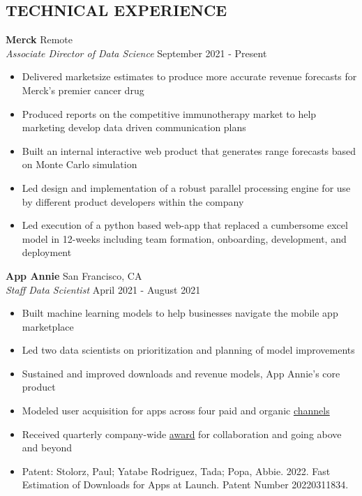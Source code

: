 \documentclass[line,margin,10pt]{res}
\begin{document}
\begin{resume}
\section{TECHNICAL EXPERIENCE}
\textbf{Merck} \hfill Remote\\
{\sl Associate Director of Data Science} \hfill September 2021 - Present
\begin{itemize} \itemsep -2pt
	\item Delivered marketsize estimates to produce more accurate revenue forecasts for Merck's premier cancer drug
	\item Produced reports on the competitive immunotherapy market to help marketing develop data driven communication plans
	\item Built an internal interactive web product that generates range forecasts based on Monte Carlo simulation
	\item Led design and implementation of a robust parallel processing engine for use by different product developers within the company
	\item Led execution of a python based web-app that replaced a cumbersome excel model in 12-weeks including team formation, onboarding, development, and deployment
\end{itemize}
{\vspace{-0.25cm}}
\textbf{App Annie} \hfill San Francisco, CA\\
{\sl Staff  Data Scientist} \hfill April 2021 - August 2021
\begin{itemize} \itemsep -2pt
\item Built machine learning models to help businesses navigate the mobile app marketplace
\item Led two data scientists on prioritization and planning of model improvements
\item Sustained and improved downloads and revenue models, App Annie's core product
\item Modeled user acquisition for apps across four paid and organic \href{https://www.appannie.com/en/insights/product-announcements/understand-paid-vs-organic-downloads-with-improved-download-channel-report/}{channels}
\item Received quarterly company-wide \href{https://www.linkedin.com/pulse/meet-abbie-popa-staff-data-scientist-from-our-amer-region-thomas/?trackingId=BPJh%2B6dFR%2Baz%2BUpkpGznRA%3D%3D}{award} for collaboration and going above and beyond
\item Patent: Stolorz, Paul; Yatabe Rodriguez, Tada; Popa, Abbie. 2022. Fast Estimation of Downloads for Apps at Launch. Patent Number 20220311834.

\end{itemize}
\end{resume}
\end{document}
